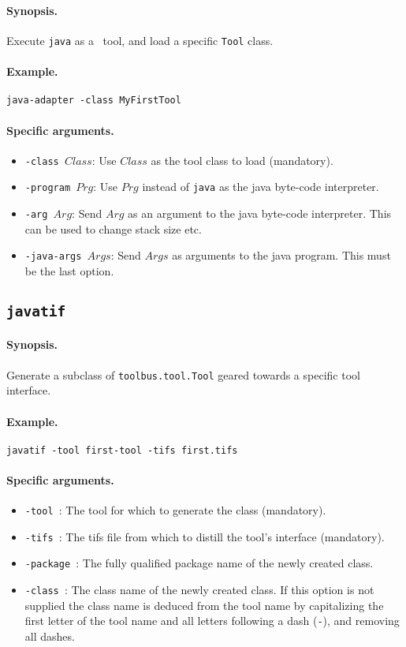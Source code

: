 \paragraph{Synopsis.} Execute {\tt java} as a \TB\ tool, 
and load a specific {\tt Tool} class.

\paragraph{Example.} {\tt java-adapter -class MyFirstTool}

\paragraph{Specific arguments.}
\begin{itemize}
\item {\tt -class $Class$}: Use $Class$ as the tool class to load (mandatory).
\item {\tt -program $Prg$}: Use $Prg$ instead of {\tt java} as the java byte-code
	interpreter.
\item {\tt -arg $Arg$}: Send $Arg$ as an argument to the java byte-code
	interpreter. This can be used to change stack size etc.
\item {\tt -java-args $Args$}: Send $Args$ as arguments to the java program.
	This must be the last option.
\end{itemize}

\subsection{\label{javatif}{\tt javatif}}

\paragraph{Synopsis.} Generate a subclass of {\tt toolbus.tool.Tool}
geared towards a specific tool interface.

\paragraph{Example.} {\tt javatif -tool first-tool -tifs first.tifs}

\paragraph{Specific arguments.}
\begin{itemize}
\item {\tt -tool }: The tool for which to generate the class (mandatory).
\item {\tt -tifs }: The tifs file from which to distill the tool's interface
	(mandatory).
\item {\tt -package }: The fully qualified package name of the newly
	created class.
\item {\tt -class }: The class name of the newly created class. If this
    	option is not supplied the class name is deduced from the tool name
	by capitalizing the first letter of the tool name and all letters
	following a dash ({\tt -}), and removing all dashes.
\end{itemize}


